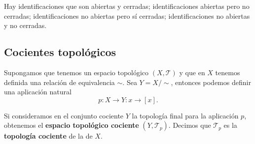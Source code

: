 \begin{observation}
Hay identificaciones que son abiertas y cerradas; identificaciones abiertas pero no cerradas; identificaciones no abiertas pero sí cerradas; identificaciones no abiertas y no cerradas.
\end{observation}
\subsection{Cocientes topológicos}
Supongamos que tenemos un espacio topológico $\displaystyle \left(X, \mathcal{T}\right) $ y que en $\displaystyle X $ tenemos definida una relación de equivalencia $\displaystyle \sim  $. Sea $\displaystyle Y = X / \sim  $, entonces podemos definir una aplicación natural
\[p : X \to Y : x \to \left[x\right]  .\]
\begin{definition}
Si consideramos en el conjunto cociente $\displaystyle Y $ la topología final para la aplicación $\displaystyle p $, obtenemos el \textbf{espacio topológico cociente} $\displaystyle \left(Y, \mathcal{T}_{p}\right) $. Decimos que $\displaystyle \mathcal{T}_{p} $ es la \textbf{topología cociente} de la de $\displaystyle X $.
\end{definition}


